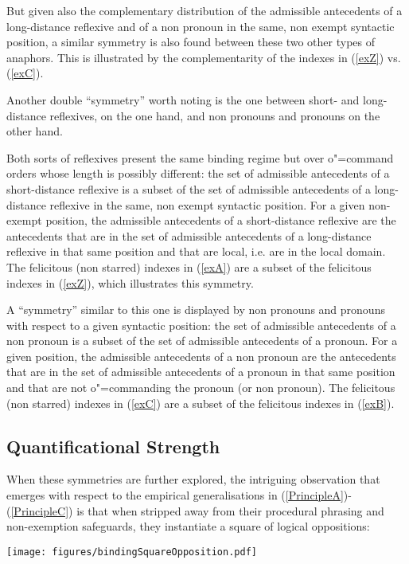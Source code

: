 \documentclass[output=paper
	        ,collection
	        ,collectionchapter
 	        ,biblatex
                ,babelshorthands
                ,newtxmath
                ,draftmode
                ,colorlinks, citecolor=brown
]{langscibook}
\begin{document}
But given also the complementary 
distribution of the admissible antecedents of a long-distance
reflexive and of a non pronoun in the same, non exempt syntactic position,
a similar symmetry is also found between these two other types of anaphors.
This is illustrated by the complementarity of the indexes in (\ref{exZ}) vs. (\ref{exC}).

Another double ``symmetry'' worth noting is the one
between short- and long-distance reflexives, on the one hand,
and non pronouns and pronouns on the other hand.

Both sorts
of reflexives present the same binding regime but over
o"=command orders whose length is possibly different: the set
of admissible antecedents of a short-distance reflexive is a subset
of the set of admissible antecedents of a long-distance reflexive
in the same, non exempt syntactic position. For a given non-exempt position,
the admissible antecedents of a short-distance reflexive are the antecedents 
that are in the set of admissible antecedents of a long-distance reflexive
in that same position and that are local, i.e. are in the local domain. The felicitous (non starred) indexes 
in (\ref{exA}) are a subset of the felicitous indexes in (\ref{exZ}), which illustrates this symmetry.

A ``symmetry'' similar to
this one is displayed by non pronouns and pronouns with respect
to a given syntactic position: the set of admissible antecedents of
a non pronoun is a subset of the set of admissible antecedents of
a pronoun. For a given position,
the admissible antecedents of a non pronoun are the antecedents 
that are in the set of admissible antecedents of a pronoun
in that same position and that are not o"=commanding the pronoun (or non pronoun).
The felicitous (non starred) indexes 
in (\ref{exC}) are a subset of the felicitous indexes in (\ref{exB}).

\subsection{Quantificational Strength \label{quantAnaphor}}

When these symmetries are further explored, 
the intriguing observation that emerges 
with respect to the empirical generalisations in
(\ref{PrincipleA})-(\ref{PrincipleC}) is that when stripped away from
their procedural phrasing and non-exemption safeguards,
they instantiate a square of logical oppositions:

\begin{exe}
\ex
\label{bindingSquareOpposition}
\end{exe}
\vspace{-7mm}
\centerline{\texttt{[image: figures/bindingSquareOpposition.pdf]}}
\end{document}

